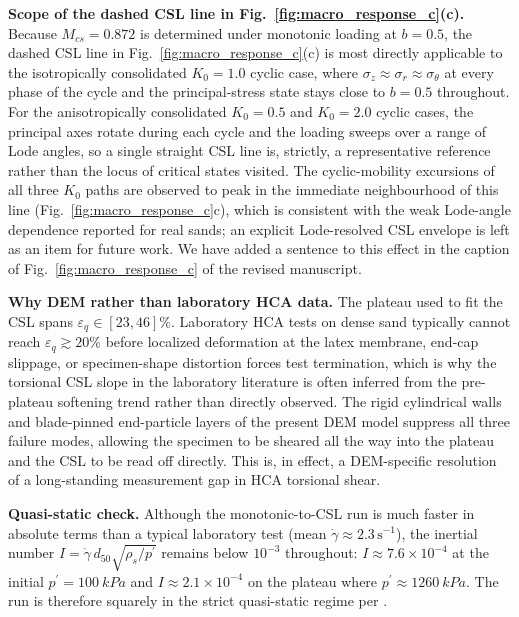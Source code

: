 \documentclass[11pt,a4paper]{article}
\newcommand{\Kzero}{\ensuremath{K_0}}
\begin{document}
\medskip
\noindent\textbf{Scope of the dashed CSL line in
Fig.~\ref{fig:macro_response_c}(c).}
Because $M_{cs}=0.872$ is determined under monotonic loading at
$b=0.5$, the dashed CSL line in Fig.~\ref{fig:macro_response_c}(c)
is most directly applicable to the isotropically consolidated
$\Kzero=1.0$ cyclic case, where $\sigma_z\approx \sigma_r\approx
\sigma_\theta$ at every phase of the cycle and the principal-stress
state stays close to $b=0.5$ throughout. For the anisotropically
consolidated $\Kzero=0.5$ and $\Kzero=2.0$ cyclic cases, the
principal axes rotate during each cycle and the loading sweeps over
a range of Lode angles, so a single straight CSL line is, strictly,
a representative reference rather than the locus of critical states
visited. The cyclic-mobility excursions of all three $\Kzero$ paths
are observed to peak in the immediate neighbourhood of this line
(Fig.~\ref{fig:macro_response_c}c), which is consistent with the
weak Lode-angle dependence reported for real sands; an explicit
Lode-resolved CSL envelope is left as an item for future work. We
have added a sentence to this effect in the caption of
Fig.~\ref{fig:macro_response_c} of the revised manuscript.

\medskip
\noindent\textbf{Why DEM rather than laboratory HCA data.}
The plateau used to fit the CSL spans
$\varepsilon_q\in[23,46]\%$. Laboratory HCA tests on dense sand
typically cannot reach $\varepsilon_q\gtrsim 20\%$ before localized
deformation at the latex membrane, end-cap slippage, or
specimen-shape distortion forces test termination, which is why the
torsional CSL slope in the laboratory literature is often inferred
from the pre-plateau softening trend rather than directly observed.
The rigid cylindrical walls and blade-pinned end-particle layers of
the present DEM model suppress all three failure modes, allowing the
specimen to be sheared all the way into the plateau and the CSL to
be read off directly. This is, in effect, a DEM-specific resolution
of a long-standing measurement gap in HCA torsional shear.

\medskip
\noindent\textbf{Quasi-static check.} Although the
monotonic-to-CSL run is much faster in absolute terms than a typical
laboratory test (mean $\dot\gamma\approx 2.3\,\mathrm{s^{-1}}$), the
inertial number $I=\dot\gamma\,d_{50}\sqrt{\rho_s/p^{\prime}}$
remains below $10^{-3}$ throughout: $I\approx 7.6\times 10^{-4}$ at
the initial $p^{\prime}=\SI{100}{kPa}$ and
$I\approx 2.1\times 10^{-4}$ on the plateau where
$p^{\prime}\approx \SI{1260}{kPa}$. The run is therefore squarely in
the strict quasi-static regime per \citet{GDRMiDi2004}.
\end{document}
